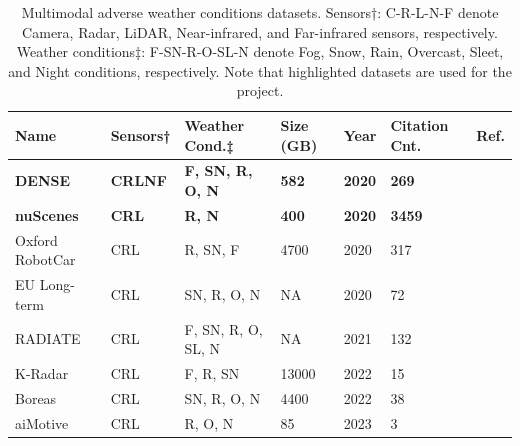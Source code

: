 \documentclass[report.tex]{subfiles}
\begin{document}
    \begin{table}[!ht]
        \centering
        \caption{Multimodal adverse weather conditions datasets. Sensors†: C-R-L-N-F denote Camera, Radar, LiDAR, Near-infrared, and Far-infrared sensors, respectively. Weather conditions‡: F-SN-R-O-SL-N denote Fog, Snow, Rain, Overcast, Sleet, and Night conditions, respectively. Note that highlighted datasets are used for the project.}
        \begin{tabular}{|l|l|l|l|l|l|l|}
        \hline
            \textbf{Name} & \textbf{Sensors†} & \textbf{Weather Cond.‡} & \textbf{Size (GB)} & \textbf{Year} & \textbf{Citation Cnt.} & \textbf{Ref.} \\ \hline
            \textbf{DENSE} & \textbf{CRLNF} & \textbf{F, SN, R, O, N} & \textbf{582} & \textbf{2020} & \textbf{269} & \textbf{\cite{bijelic2020seeing}} \\ \hline
            \textbf{nuScenes} & \textbf{CRL} & \textbf{R, N} & \textbf{400} & \textbf{2020} & \textbf{3459} & \textbf{\cite{caesar2020nuscenes}} \\ \hline
            Oxford RobotCar & CRL & R, SN, F & 4700 & 2020 & 317 & \cite{barnes2020oxford} \\ \hline
            EU Long-term & CRL & SN, R, O, N & NA & 2020 & 72 & \cite{yan2020eu} \\ \hline
            RADIATE & CRL & F, SN, R, O, SL, N & NA & 2021 & 132 & \cite{sheeny2021radiate} \\ \hline
            K-Radar & CRL & F, R, SN & 13000 & 2022 & 15 & \cite{Paek2022Jun} \\ \hline
            Boreas & CRL & SN, R, O, N & 4400 & 2022 & 38 & \cite{burnett2022boreas} \\ \hline
            aiMotive & CRL & R, O, N & 85 & 2023 & 3 & \cite{matuszka2022aimotive} \\ \hline
        \end{tabular}
        \label{datasets}
    \end{table}


\end{document}
